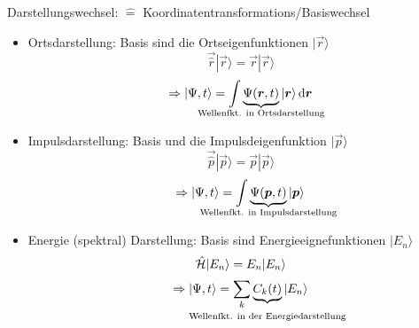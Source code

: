 \begin{comment}
\chapter{Der Liebe Gott}
\section{Verliebt sein}
\subsection{wer darf wo rumfumeln}
rumfumeln ist nicht unabhängig
\subsection{was gehört zu wem}
\section{Gender-Theorie}
es gibt unendliche viele Wahrscheinlichkeiten und Zuordnungen (von Gendern)
\section{Der Satz von Stinson}
\end{comment}



%
%
\noindent
Darstellungswechsel: $\widehat =$ Koordinatentransformations/Basiswechsel
\bei 
\begin{itemize} 
	\item Ortsdarstellung: Basis sind die Ortseigenfunktionen $|\vec{r}\rangle$
	$$\vec{\hat r} | \vec{r} \rangle = \vec{r}| \vec{r}\rangle$$
	$$\Rightarrow |\Psi, t\rangle =\int \underbrace{\Psi(\vec{r},t)}_{\mathclap{\tx{Wellenfkt. in Ortsdarstellung}}}|\vec{r}\rangle \dif\vec{r}$$
	\item Impulsdarstellung: Basis und die Impulsdeigenfunktion $|\vec{p}\rangle$
	$$\vec{\hat p} |\vec{p} \rangle = \vec{p} | \vec{p}\rangle$$
	$$\Rightarrow |\Psi, t \rangle =\int \underbrace{\Psi(\vec{p},t)}_{\mathclap{\tx{Wellenfkt. in Impulsdarstellung}}}|\vec{p}\rangle$$
	\item Energie (spektral) Darstellung: Basis sind Energieeignefunktionen $|E_n \rangle$
	$$\hat {\mathcal{H}}| E_n\rangle = E_n|E_n\rangle$$
	$$\Rightarrow |\Psi,t\rangle =\sum_k \underbrace{C_k (t)}_{\substack{ \\[5pt] \mathclap{\tx{Wellenfkt. in der Energiedarstellung}}}} |E_n\rangle$$
\end{itemize}

